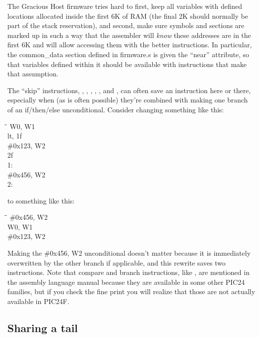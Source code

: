 The Gracious Host firmware tries hard to first, keep all variables with
defined locations allocated inside the first 6K of RAM (the final 2K should
normally be part of the stack reservation), and second, make sure symbols
and sections are marked up in such a way that the assembler will \emph{know}
these addresses are in the first 6K and will allow accessing them with the
better instructions.  In particular, the common\_data section defined in
firmware.s is given the ``near'' attribute, so that variables defined within
it should be available with instructions that make that assumption.

The ``skip'' instructions, , , ,
, , and , can often save an instruction
here or there, especially when (as is often possible) they're combined with
making one branch of an if/then/else unconditional.  Consider changing
something like this:

\begin{tabbing}
\qquad\=\qquad\qquad\=\kill
\>\>W0, W1\\
\>\>lt, 1f\\
\>\>\#0x123, W2\\
\>\>2f\\
1:\\
\>\>\#0x456, W2\\
2:\\
\end{tabbing}

to something like this:

\begin{tabbing}
\qquad\=\qquad\qquad\=\kill
\>\>\#0x456, W2\\
\>\>W0, W1\\
\>\>\#0x123, W2\\
\end{tabbing}

Making the  \#0x456, W2 unconditional doesn't matter because it is
immediately overwritten by the other branch if applicable, and this rewrite
saves two instructions.  Note that compare and branch instructions, like
, are mentioned in the assembly language manual because they are
available in some other PIC24 families, but if you check the fine print you
will realize that those are not actually available in PIC24F.

\subsection{Sharing a tail}

